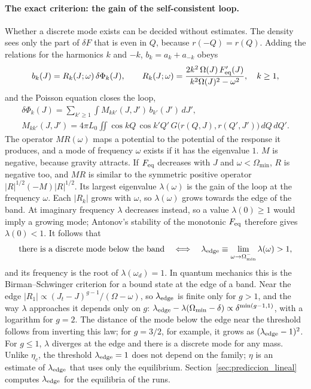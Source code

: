 \documentclass[11pt,a4paper]{article}
\begin{document}
\paragraph{The exact criterion: the gain of the self-consistent loop.}
\label{sec:lazo}
Whether a discrete mode exists can be decided without estimates. The density sees only the
part of $\delta F$ that is even in $Q$, because $r(-Q)=r(Q)$. Adding the relations for the
harmonics $k$ and $-k$, $b_k=a_k+a_{-k}$ obeys
\[
  b_k(J)=R_k(J;\omega)\,\delta\Phi_k(J),\qquad
  R_k(J;\omega)=\frac{2k^2\,\Omega(J)\,F_{\rm eq}'(J)}{k^2\Omega(J)^2-\omega^2},\quad k\ge1,
\]
and the Poisson equation closes the loop,
\begin{gather*}
  \delta\Phi_k(J)=\sum_{k'\ge1}\int M_{kk'}(J,J')\,b_{k'}(J')\,dJ',\\
  M_{kk'}(J,J')=4\pi L_0\iint\cos kQ\,\cos k'Q'\,G\big(r(Q,J),r(Q',J')\big)\,dQ\,dQ'.
\end{gather*}
The operator $MR(\omega)$ maps a potential to the potential of the response it produces, and a
mode of frequency $\omega$ exists if it has the eigenvalue $1$. $M$ is negative, because
gravity attracts. If $F_{\rm eq}$ decreases with $J$ and $\omega<\Omega_{\min}$, $R$ is negative too,
and $MR$ is similar to the symmetric positive operator $|R|^{1/2}(-M)|R|^{1/2}$. Its largest
eigenvalue $\lambda(\omega)$ is the gain of the loop at the frequency $\omega$. Each $|R_k|$ grows with
$\omega$, so $\lambda(\omega)$ grows towards the edge of the band. At imaginary frequency $\lambda$
decreases instead, so a value $\lambda(0)\ge1$ would imply a growing mode; Antonov's stability
of the monotonic $F_{\rm eq}$ therefore gives $\lambda(0)<1$. It follows that
\[
  \text{there is a discrete mode below the band}\quad\Longleftrightarrow\quad
  \lambda_{\rm edge}\equiv\lim_{\omega\to\Omega_{\min}^-}\lambda(\omega)>1,
\]
and its frequency is the root of $\lambda(\omega_d)=1$. In quantum mechanics this is the
Birman--Schwinger criterion for a bound state at the edge of a band. Near the edge
$|R_1|\propto(J_t-J)^{g-1}/(\Omega-\omega)$, so $\lambda_{\rm edge}$ is finite only for $g>1$, and the way
$\lambda$ approaches it depends only on $g$:
$\lambda_{\rm edge}-\lambda(\Omega_{\min}-\delta)\propto\delta^{\min(g-1,1)}$, with a logarithm for $g=2$. The
distance of the mode below the edge near the threshold follows from inverting this law;
for $g=3/2$, for example, it grows as $(\lambda_{\rm edge}-1)^2$. For $g\le1$, $\lambda$ diverges at the
edge and there is a discrete mode for any mass. Unlike $\eta_c$, the threshold
$\lambda_{\rm edge}=1$ does not depend on the family; $\eta$ is an estimate of $\lambda_{\rm edge}$
that uses only the equilibrium. Section~\ref{sec:prediccion_lineal} computes $\lambda_{\rm edge}$ for
the equilibria of the runs.
\end{document}
